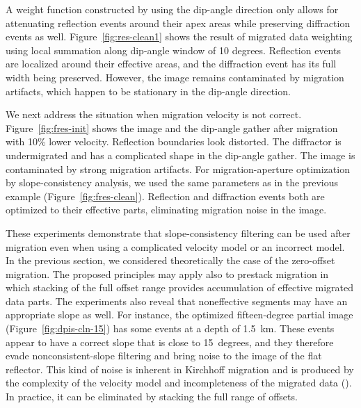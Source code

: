 
A weight function constructed by using the dip-angle direction only
allows for attenuating reflection events around their apex areas while preserving diffraction events as well. 
Figure~\ref{fig:res-clean1} shows the result of migrated data weighting using local summation along dip-angle
window of 10 degrees.
Reflection events are localized around their effective areas, and the diffraction event has its full width being preserved. However,
the image remains contaminated by migration artifacts, which happen to be stationary in the dip-angle direction.

We next address the situation when migration velocity is not correct. Figure~\ref{fig:fres-init} shows the image and the dip-angle 
gather after migration with 10\% lower velocity. Reflection boundaries look distorted. The diffractor is undermigrated and has a complicated
shape in the dip-angle gather. The image is contaminated by strong migration artifacts. For migration-aperture optimization by
slope-consistency analysis, we used the same parameters as in the previous example (Figure~\ref{fig:fres-clean}).
Reflection and diffraction events both are optimized to their effective parts, eliminating migration noise in the image.


These experiments demonstrate that slope-consistency filtering can be used after migration even when using a complicated velocity model or an
incorrect model. In the previous section, we considered theoretically the case of the zero-offset migration. 
The proposed principles may apply also to prestack migration in which stacking of the full offset range provides accumulation of
effective migrated data parts.
The experiments also reveal that noneffective segments may have an appropriate slope as well. For instance, the optimized fifteen-degree
partial image (Figure~\ref{fig:dpis-cln-15}) has some events at a depth of 1.5~km. These events appear to have a correct slope that is 
close to 15~degrees, and they therefore evade nonconsistent-slope filtering and bring noise to the image of the flat reflector. This kind
of noise is inherent in Kirchhoff migration and is produced by the complexity of the velocity model and incompleteness of the migrated 
data (\citealp[]{stolk04}). In practice, it can be eliminated by stacking the full range of offsets.

